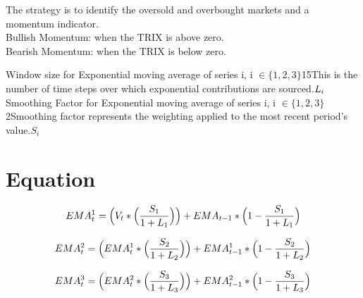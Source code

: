 \documentclass{article}
\begin{document}
\logo
{} %
\tblofcontents


\howtotrade
{The strategy is to identify the oversold and overbought markets and a momentum indicator. \\
Bullish Momentum: when the TRIX is above zero. \\
Bearish Momentum: when the TRIX is below zero.
}


{Window size for \break Exponential moving average of series i, \break i $\in \{1,2,3\}$}{15}{This is the number of time steps over which exponential contributions are sourced.}{$L_{i}$}
{Smoothing Factor for \break Exponential moving average of series i, \break i $\in \{1,2,3\}$}{2}{Smoothing factor represents the weighting applied to the most recent period’s value.}{$S_{i}$}
\stoptable

\newpage
\section{Equation}
\begin{equation}
    EMA_{t}^{1} = \Big(V_{t} * \Big(\frac{S_{1}}{1 + L_{1}}\Big)\Big) + EMA_{t-1} * \Big(1-\frac{S_{1}}{1 + L_{1}}\Big)
\end{equation}

\begin{equation}
    EMA_{t}^{2} = \Big(EMA_{t}^{1} * \Big(\frac{S_{2}}{1 + L_{2}}\Big)\Big) + EMA_{t-1}^{1} * \Big(1-\frac{S_{2}}{1 + L_{2}}\Big)
\end{equation}

\begin{equation}
    EMA_{t}^{3} = \Big(EMA_{t}^{2} * \Big(\frac{S_{3}}{1 + L_{3}}\Big)\Big) + EMA_{t-1}^{2} * \Big(1-\frac{S_{3}}{1 + L_{3}}\Big)
\end{equation}
\end{document}
